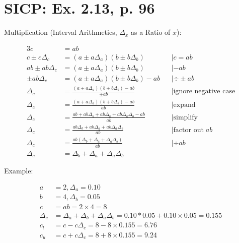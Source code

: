 \documentclass[a4paper]{scrartcl}
\begin{document}
\setlength\parindent{0pt}

\section*{SICP: Ex. 2.13, p. 96}

Multiplication (Interval Arithmetics, $\Delta_x$ as a Ratio of $x$):

\begin{alignat}{3}
    c &= ab \\
    c \pm c\Delta_c &= (a \pm a\Delta_a) (b \pm b\Delta_b) &&| c = ab \\
    ab \pm ab\Delta_c &= (a \pm a\Delta_a)(b \pm b\Delta_b) &&| -ab \\
    \pm ab\Delta_c &= (a \pm a\Delta_a)(b \pm b\Delta_b) - ab &&| \div \pm ab \\
    \Delta_c &= \frac{(a \pm a\Delta_a)(b \pm b\Delta_b) - ab}{\pm ab} &&| \text{ignore negative case} \\
    \Delta_c &= \frac{(a + a\Delta_a)(b + b\Delta_b) - ab}{ab} &&| \text{expand} \\
    \Delta_c &= \frac{ab+ab\Delta_b+ab\Delta_a+ab\Delta_a\Delta_b-ab}{ab} &&| \text{simplify} \\
    \Delta_c &= \frac{ab\Delta_b+ab\Delta_a+ab\Delta_a\Delta_b}{ab} &&| \text{factor out} \; ab \\
    \Delta_c &= \frac{ab(\Delta_b+\Delta_a+\Delta_a\Delta_b)}{ab} &&| \div ab \\
    \Delta_c &= \Delta_b+\Delta_a+\Delta_a\Delta_b
\end{alignat}

Example:

\begin{align}
    a &= 2, \Delta_a = 0.10 \\
    b &= 4, \Delta_b = 0.05 \\
    c &= ab = 2 \times 4 = 8 \\
    \Delta_c &= \Delta_a + \Delta_b + \Delta_a\Delta_b = 0.10 * 0.05 + 0.10 \times 0.05 = 0.155 \\
    c_l &= c - c\Delta_c = 8 - 8 \times 0.155 = 6.76 \\
    c_u &= c + c\Delta_c = 8 + 8 \times 0.155 = 9.24
\end{align}
\end{document}
